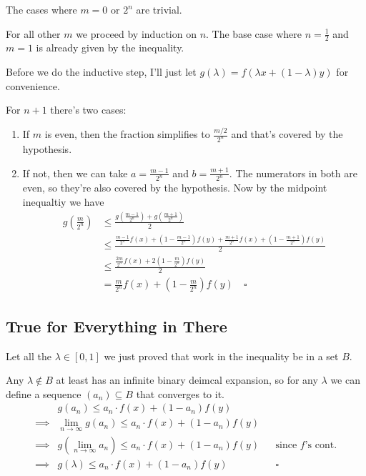 \documentclass[12pt]{article}
\begin{document}
The cases where $m=0$ or $2^n$ are trivial.

For all other $m$ we proceed by induction on $n$.
The base case where $n=\frac{1}{2}$ and $m=1$ is already given by the inequality.

Before we do the inductive step, I'll just let
$g(\lambda)=f(\lambda x + (1-\lambda)y)$ for convenience.

For $n+1$ there's two cases:
\begin{enumerate}
  \item If $m$ is even, then the fraction simplifies to $\frac{m/2}{2^n}$ and that's covered by the hypothesis.
  \item If not, then we can take $a=\frac{m-1}{2^n}$ and $b=\frac{m+1}{2^n}$.
        The numerators in both are even, so they're also covered by the hypothesis.
        Now by the midpoint inequaltiy we have
        \begin{align*}
          g\left(\frac{m}{2^n}\right)
           & \le \frac{g\left(\frac{m-1}{2^n}\right)+g\left(\frac{m+1}{2^n}\right)}{2} \\
           & \le \frac{\frac{m-1}{2^n}f(x)+\left(1-\frac{m-1}{2^n}\right)f(y)
          +\frac{m+1}{2^n}f(x)+\left(1-\frac{m+1}{2^n}\right)f(y)}{2}                  \\
           & \le \frac{\frac{2m}{2^n}f(x)+2\left(1-\frac{m}{2^n}\right)f(y)}{2}        \\
           & = \frac{m}{2^n}f(x)+\left(1-\frac{m}{2^n}\right)f(y)\quad\square
        \end{align*}
\end{enumerate}

\subsection{True for Everything in There}

Let all the $\lambda \in [0, 1]$ we just proved that work in the inequality be in a set $B$.

Any $\lambda \notin B$ at least has an infinite binary deimcal expansion, so
for any $\lambda$ we can define a sequence $(a_n) \subseteq B$ that converges to it.
\begin{align*}
             & g(a_n) \le a_n \cdot f(x) + (1-a_n)f(y)                                                              \\
  \implies{} & \lim_{n \to \infty} g(a_n) \le a_n \cdot f(x) + (1-a_n)f(y)                                          \\
  \implies{} & g\left(\lim_{n \to \infty} a_n\right) \le a_n \cdot f(x) + (1-a_n)f(y) &  & \text{since $f$'s cont.} \\
  \implies{} & g(\lambda) \le a_n \cdot f(x) + (1-a_n)f(y)                            &  & \square
\end{align*}
\end{document}
